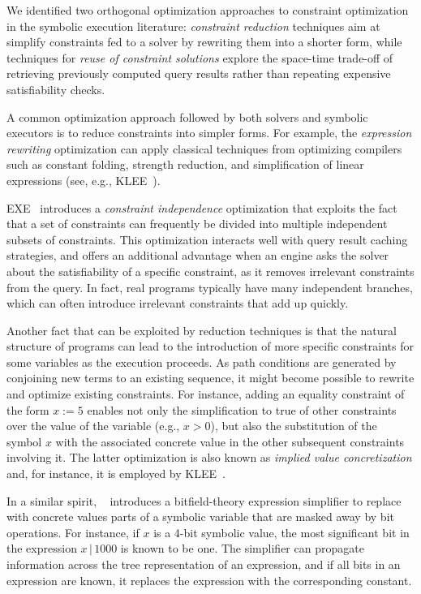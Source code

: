 We identified two orthogonal optimization approaches to constraint optimization in the symbolic execution literature: {\em constraint reduction} techniques aim at simplify constraints fed to a solver by rewriting them into a shorter form, while techniques for {\em reuse of constraint solutions} explore the space-time trade-off of retrieving previously computed query results rather than repeating expensive satisfiability checks.

\medskip{} 
A common optimization approach followed by both solvers and symbolic executors is to reduce constraints into simpler forms. For example, the {\em expression rewriting} optimization can apply classical techniques from optimizing compilers such as constant folding, strength reduction, and simplification of linear expressions (see, e.g., {\sc KLEE}~\cite{KLEE-OSDI08}).

{\sc EXE}~\cite{EXE-CCS06} introduces a {\em constraint independence} optimization that exploits the fact that a set of constraints can frequently be divided into multiple independent subsets of constraints. This optimization interacts well with query result caching strategies, and offers an additional advantage when an engine asks the solver about the satisfiability of a specific constraint, as it removes irrelevant constraints from the query. In fact, real programs typically have many independent branches, which can often introduce irrelevant constraints that add up quickly.

Another fact that can be exploited by reduction techniques is that the natural structure of programs can lead to the introduction of more specific constraints for some variables as the execution proceeds. As path conditions are generated by conjoining new terms to an existing sequence, it might become possible to rewrite and optimize existing constraints. For instance, adding an equality constraint of the form $x:=5$ enables not only the simplification to true of other constraints over the value of the variable (e.g., $x>0$), but also the substitution of the symbol $x$ with the associated concrete value in the other subsequent constraints involving it. The latter optimization is also known as {\em implied value concretization} and, for instance, it is employed by {\sc KLEE}~\cite{KLEE-OSDI08}.

In a similar spirit, {\sc \stwoe}~\cite{CKC-TOCS12} introduces a bitfield-theory expression simplifier to replace with concrete values parts of a symbolic variable that are masked away by bit operations. For instance, if $x$ is a 4-bit symbolic value, the most significant bit in the expression $x\,|\,1000$ is known to be one. The simplifier can propagate information across the tree representation of an expression, and if all bits in an expression are known, it replaces the expression with the corresponding constant.
 
